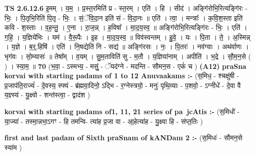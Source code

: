\documentclass[17pt]{extarticle}
\begin{document}
                                \textbf{ TS 2.6.12.6} \newline
                  इ॒मम् । य॒म॒ । प्र॒स्त॒रमिति॑ प्र - स्त॒रम् । एति॑ । हि । सीद॑ । अङ्गि॑रोभि॒रित्यङ्गि॑रः - भिः॒ । पि॒तृभि॒रिति॑ पि॒तृ - भिः॒ । सं॒ॅवि॒दा॒न इति॑ सं - वि॒दा॒नः ॥ एति॑ । त्वा॒ । मन्त्राः᳚ । क॒वि॒श॒स्ता इति॑ कवि - श॒स्ताः । व॒ह॒न्तु॒ । ए॒ना । रा॒ज॒न्न् । ह॒विषा᳚ । मा॒द॒य॒स्व॒ ॥ अङ्गि॑रोभि॒रित्यङ्गि॑रः - भिः॒ । एति॑ । ग॒हि॒ । य॒ज्ञिये॑भिः । यम॑ । वै॒रू॒पैः । इ॒ह । मा॒द॒य॒स्व॒ ॥ विव॑स्वन्तम् । हु॒वे॒ । यः । पि॒ता । ते॒ । अ॒स्मिन्न् । य॒ज्ञे । ब॒र्॒.हिषि॑ । एति॑ । नि॒षद्येति॑ नि - सद्य॑ ॥ अङ्गि॑रसः । नः॒ । पि॒तरः॑ । नव॑ग्वाः । अथ॑र्वाणः । भृग॑वः । सो॒म्यासः॑ ॥ तेषा᳚म् । व॒यम् । सु॒म॒ताविति॑ सु - म॒तौ । य॒ज्ञिया॑नाम् । अपीति॑ । भ॒द्रे । सौ॒म॒न॒से ( ) । स्या॒म॒ ॥ \textbf{  70} \newline
                  \newline
                      (भ॒वा॒ - ऽस्मभ्य॒ - मसुं॒ - ॅयद॑ग्ने - मदन्ति - सौमन॒स - एकं॑ च )  \textbf{(A12)} \newline \newline
\textbf{praSna korvai with starting padams of 1 to 12 Anuvaakams :-} \newline
(स॒मिध॒ - श्चक्षु॑षी - प्र॒जाप॑ति॒राज्यं॑ - दे॒वस्य॒ स्फ्यं - ब्र॑ह्मवा॒दिनो॒ ऽद्भि - र॒ग्नेस्त्रयो॒ - मनुः॑ पृथि॒व्याः - प॒शवो॒ - ऽग्नीधे॑ - दे॒वा वै य॒ज्ञ्स्य॑ - यु॒क्ष्वो - शन्त॑स्त्वा॒ - द्वाद॑श ) \newline

\textbf{korvai with starting padams of1, 11, 21 series of pa~jcAtis :-} \newline
(स॒मिधो॑ - या॒ज्या॑ - तस्मा॒न्नभा॒ऽगꣳ - हि तमन्वि- त्या॑ह प्र॒जा वा - आ॒हेत्या॑ह - यु॒क्ष्वा हि - स॑प्त॒तिः ) \newline

\textbf{first and last padam of Sixth praSnam of kANDam 2 :-} \newline
(स॒मिधः॑ - सौमन॒से स्या॑म ) \newline 
\end{document}
